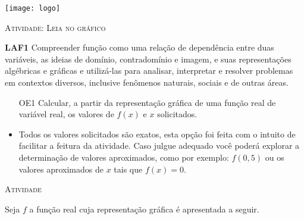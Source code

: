 \documentclass[10 pt,usenames,dvipsnames, oneside]{article}
\begin{document}
\begin{center}
  \begin{minipage}[l]{3cm}
\texttt{[image: logo]}    
\end{minipage}\hfill
\begin{minipage}[r]{.8\textwidth}
 {\Large \scshape Atividade: Leia no gráfico}  
\end{minipage}
\end{center}
\vspace{.2cm}

\ifdefined\prof
\begin{objetivos}
\item \textbf{LAF1} Compreender função como uma relação de dependência entre duas variáveis, as ideias de domínio, contradomínio e imagem, e suas representações algébricas e gráficas e utilizá-las para analisar, interpretar e resolver problemas em contextos diversos, inclusive fenômenos naturais, sociais e de outras áreas.
\end{objetivos}

\begin{goals}
\begin{enumerate}

\item[OE1] Calcular, a partir da representação gráfica de uma função real de variável real, os valores de $f(x)$ e $x$ solicitados.

\end{enumerate}

\tcblower

\begin{itemize}
\item Todos os valores solicitados são exatos, esta opção foi feita com o intuito de facilitar a feitura da atividade. Caso julgue adequado você poderá explorar a determinação de valores aproximados, como por exemplo: $f(0,5)$ ou os valores aproximados de $x$ tais que $f(x)=0$.
\end{itemize}

\end{goals}

\bigskip
\begin{center}
{\large \scshape Atividade}
\end{center}
\fi

Seja \(f\) a função real cuja representação gráfica é apresentada a seguir.

\begin{figure}[H]
\centering

\end{figure}
\end{document}
